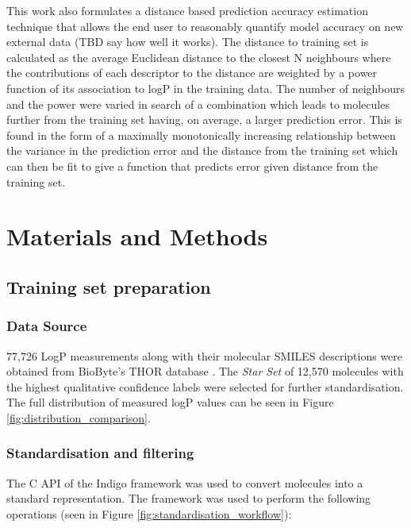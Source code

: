 \documentclass[10pt]{bmc_article}
\newenvironment{bmcformat}{\begin{raggedright}\baselineskip20pt\sloppy\setboolean{publ}{false}}{\end{raggedright}\baselineskip20pt\sloppy}
\begin{document}
\begin{bmcformat}
This work also formulates a distance based prediction accuracy estimation technique that allows the end user to reasonably quantify model accuracy on new external data (TBD say how well it works). The distance to training set is calculated as the average Euclidean distance to the closest N neighbours where the contributions of each descriptor to the distance are weighted by a power function of its association to logP in the training data. The number of neighbours and the power were varied in search of a combination which leads to molecules further from the training set having, on average, a larger prediction error. This is found in the form of a maximally monotonically increasing relationship between the variance in the prediction error and the distance from the training set which can then be fit to give a function that predicts error given distance from the training set.    
   
\section*{Materials and Methods}
\subsection*{Training set preparation}
\subsubsection*{Data Source}
77,726 LogP measurements along with their molecular SMILES descriptions were obtained from BioByte's THOR database \cite{leo_partition_1971}. The \textit{Star Set} of 12,570 molecules with the highest qualitative confidence labels were selected for further standardisation. The full distribution of measured logP values can be seen in Figure \ref{fig:distribution_comparison}.

\subsubsection*{Standardisation and filtering}
The C API of the Indigo framework \cite{_gga_????} was used to convert molecules into a standard representation. The framework was used to perform the following operations (seen in Figure \ref{fig:standardisation_workflow}): 


\end{bmcformat}
\end{document}
